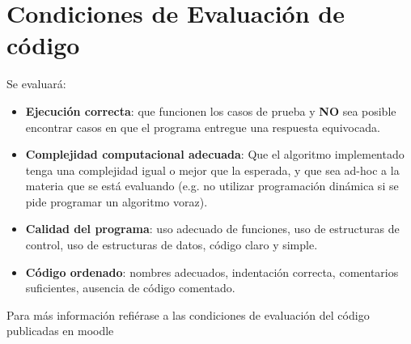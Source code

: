 \section{Condiciones de Evaluación de código}
Se evaluará:
\begin{itemize}
    \item \textbf{Ejecución correcta}: que funcionen los casos de prueba y \textbf{NO} sea posible encontrar casos en que el programa entregue una respuesta equivocada.
    \item \textbf{Complejidad computacional adecuada}: Que el algoritmo implementado tenga una complejidad igual o mejor que la esperada, y que sea ad-hoc a la materia que se está evaluando (e.g. no utilizar programación dinámica si se pide programar un algoritmo voraz).
    \item \textbf{Calidad del programa}: uso adecuado de funciones, uso de estructuras de control, uso de estructuras de datos, código claro y simple.
    \item \textbf{Código ordenado}: nombres adecuados, indentación correcta, comentarios suficientes, ausencia de código comentado.
\end{itemize}
Para más información refiérase a las condiciones de evaluación del código publicadas en moodle
